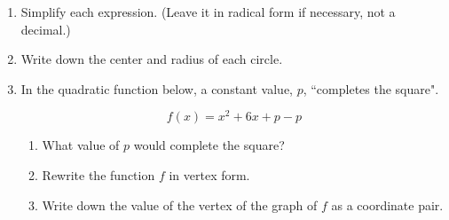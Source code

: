 \documentclass[12pt, twoside]{article}
\begin{document}
\begin{enumerate}
  \item Simplify each expression. (Leave it in radical form if necessary, not a decimal.)
    \begin{enumerate}
    \end{enumerate}
    \vspace{0.5cm}


  \item Write down the center and radius of each circle.
    \begin{enumerate}
    \end{enumerate}  \vspace{2cm}

  \item In the quadratic function below, a constant value, $p$, ``completes the square".

    \[f(x) = x^2+6x+p-p\]

    \begin{enumerate}
      \item What value of $p$ would complete the square? \vspace{1cm}
      \item Rewrite the function $f$ in vertex form. \vspace{3cm}
      \item Write down the value of the vertex of the graph of $f$ as a coordinate pair.  \vspace{2cm}
    \end{enumerate}

\newpage


\end{enumerate}
\end{document}
